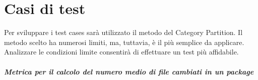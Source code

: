 \chapter{Casi di test}
Per sviluppare i test cases sarà utilizzato il metodo del Category Partition. Il metodo scelto ha numerosi limiti, ma, tuttavia, è il più semplice da applicare. Analizzare le condizioni limite consentirà di effettuare un test più affidabile.


\paragraph{Metrica per il calcolo del numero medio di file cambiati in un package\\}

